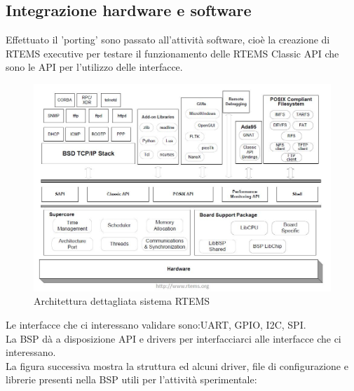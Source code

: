 \documentclass[12pt, a4paper, titlepage, oneside]{book}
\begin{document}
\begin{flushleft}
\chapter{Integrazione hardware e software}
Effettuato il 'porting' sono passato all'attività software, cioè la creazione di RTEMS executive per testare il funzionamento delle RTEMS Classic API che sono le API per l'utilizzo delle interfacce. \\
\begin{figure} [h]
\centering
    \includegraphics[scale = 0.80] {RTEMS_architecture.JPG}
    \caption{Architettura dettagliata sistema RTEMS}
    \label{fig:my_label3}
\end{figure}
Le interfacce che ci interessano validare sono:UART, GPIO, I2C, SPI.\\
La BSP dà a disposizione API e drivers per interfacciarci alle interfacce che ci interessano.\\
\newpage
La figura successiva mostra la struttura ed alcuni driver, file di configurazione e librerie presenti nella BSP utili per l'attività sperimentale:
\begin{figure} [h]
\centering

\end{figure}
\end{flushleft}
\end{document}
